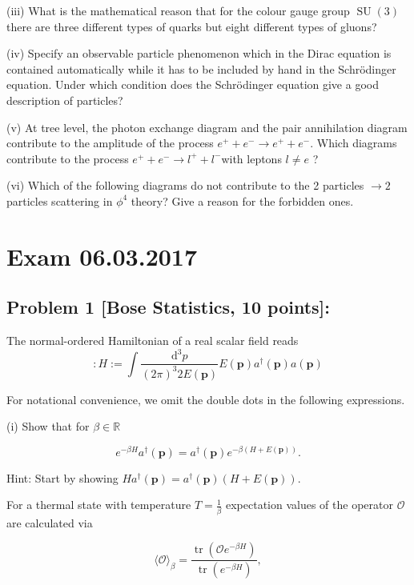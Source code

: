 \documentclass[10pt, letterpaper]{article}
\begin{document}
(iii) What is the mathematical reason that for the colour gauge group $\operatorname{SU}(3)$ there are three different types of quarks but eight different types of gluons?

(iv) Specify an observable particle phenomenon which in the Dirac equation is contained automatically while it has to be included by hand in the Schrödinger equation. Under which condition does the Schrödinger equation give a good description of particles?

(v) At tree level, the photon exchange diagram and the pair annihilation diagram contribute to the amplitude of the process $e^{+}+e^{-} \rightarrow e^{+}+e^{-}$. Which diagrams contribute to the process $e^{+}+e^{-} \rightarrow l^{+}+l^{-}$with leptons $l \neq e$ ?

(vi) Which of the following diagrams do not contribute to the 2 particles $\rightarrow 2$ particles scattering in $\phi^4$ theory? Give a reason for the forbidden ones.

\pagebreak



\section{Exam 06.03.2017}


\subsection{Problem 1 [Bose Statistics, 10 points]:}

The normal-ordered Hamiltonian of a real scalar field reads
$$
: H:=\int \frac{\mathrm{d}^3 p}{(2 \pi)^3 2 E(\mathbf{p})} E(\mathbf{p}) a^{\dagger}(\mathbf{p}) a(\mathbf{p})
$$

For notational convenience, we omit the double dots in the following expressions.

(i) Show that for $\beta \in \mathbb{R}$

$$
e^{-\beta H} a^{\dagger}(\mathbf{p})=a^{\dagger}(\mathbf{p}) e^{-\beta(H+E(\mathbf{p}))} .
$$


Hint: Start by showing $H a^{\dagger}(\mathbf{p})=a^{\dagger}(\mathbf{p})(H+E(\mathbf{p}))$.

For a thermal state with temperature $T=\frac{1}{\beta}$ expectation values of the operator $\mathcal{O}$ are calculated via

$$
\langle\mathcal{O}\rangle_\beta=\frac{\operatorname{tr}\left(\mathcal{O} e^{-\beta H}\right)}{\operatorname{tr}\left(e^{-\beta H}\right)},
$$
\end{document}
